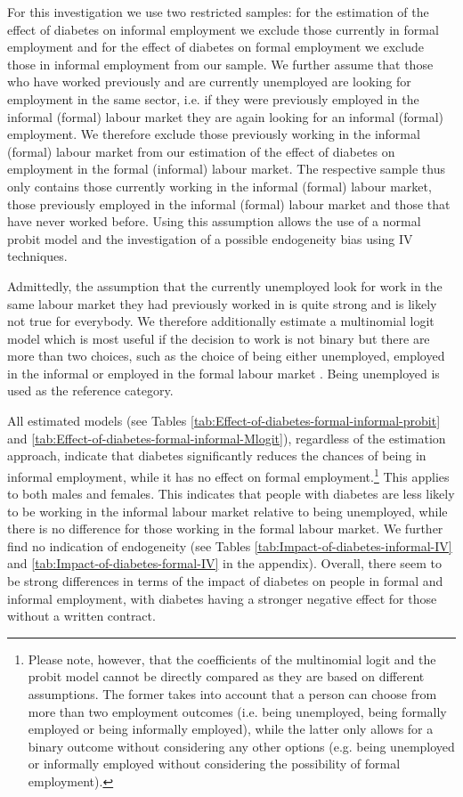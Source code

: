 For this investigation we use two restricted samples: for the estimation
of the effect of diabetes on informal employment we exclude those
currently in formal employment and for the effect of diabetes on formal
employment we exclude those in informal employment from our sample.
We further assume that those who have worked previously and are currently
unemployed are looking for employment in the same sector, i.e. if
they were previously employed in the informal (formal) labour market
they are again looking for an informal (formal) employment. We therefore
exclude those previously working in the informal (formal) labour market
from our estimation of the effect of diabetes on employment in the
formal (informal) labour market. The respective sample thus only contains
those currently working in the informal (formal) labour market, those
previously employed in the informal (formal) labour market and those
that have never worked before. Using this assumption allows the use
of a normal probit model and the investigation of a possible endogeneity
bias using \ac{IV} techniques. 


Admittedly, the assumption that the currently unemployed look for
work in the same labour market they had previously worked in is quite
strong and is likely not true for everybody. We therefore additionally
estimate a multinomial logit model which is most useful if the decision
to work is not binary but there are more than two choices, such as
the choice of being either unemployed, employed in the informal or
employed in the formal labour market \parencite{Wooldridge2002}. Being
unemployed is used as the reference category.

All estimated models (see Tables \ref{tab:Effect-of-diabetes-formal-informal-probit}
and \ref{tab:Effect-of-diabetes-formal-informal-Mlogit}), regardless
of the estimation approach,  indicate that diabetes significantly
reduces the chances of being in informal employment, while it has
no effect on formal employment.\footnote{Please note, however, that the coefficients of the multinomial logit
and the probit model cannot be directly compared as they are based
on different assumptions. The former takes into account that a person
can choose from more than two employment outcomes (i.e. being unemployed,
being formally employed or being informally employed), while the latter
only allows for a binary outcome without considering any other options
(e.g. being unemployed or informally employed without considering
the possibility of formal employment).} This applies to both males and females. This indicates that people
with diabetes are less likely to be working in the informal labour
market relative to being unemployed, while there is no difference
for those working in the formal labour market. We further find no
indication of endogeneity (see Tables \ref{tab:Impact-of-diabetes-informal-IV}
and \ref{tab:Impact-of-diabetes-formal-IV} in the appendix). Overall,
there seem to be strong differences in terms of the impact of diabetes
on people in formal and informal employment, with diabetes having
a stronger negative effect for those without a written contract.


